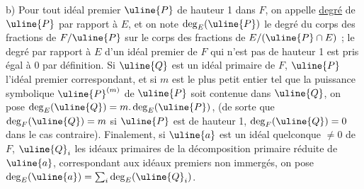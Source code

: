 b) Pour tout idéal premier $\uline{P}$ de hauteur 1 dans $F$, on appelle \uline{degré} de $\uline{P}$ par rapport à $E$, et on note $\deg_E(\uline{P})$ le degré du corps des fractions de $F/\uline{P}$ sur le corps des fractions de $E/(\uline{P}\cap E)$ ; le degré par rapport à $E$ d'un idéal premier de $F$ qui n'est pas de hauteur 1 est pris égal à 0 par définition. Si $\uline{Q}$ est un idéal primaire de $F$, $\uline{P}$ l'idéal premier correspondant, et si $m$ est le plus petit entier tel que la puissance symbolique $\uline{P}^{(m)}$ de $\uline{P}$ soit contenue dans $\uline{Q}$, on pose $\deg_E(\uline{Q})=m.\deg_E(\uline{P})$, (de sorte que $\deg_F(\uline{Q})=m$ si $\uline{P}$ est de hauteur 1, $\deg_F(\uline{Q})=0$ dans le cas contraire). Finalement, si $\uline{a}$ est un idéal quelconque $\ne0$ de $F$, $\uline{Q}_i$ les idéaux primaires de la décomposition primaire réduite de $\uline{a}$, correspondant aux idéaux premiers non immergés, on pose $\deg_E(\uline{a})=\sum_i\deg_E(\uline{Q}_i)$.

